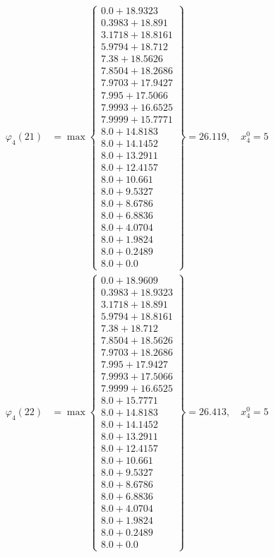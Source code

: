 \documentclass{article}
\begin{document}
\begin{align*}
  
  
  
\varphi_{4}(21) &= \max \left\{ \begin{array}{c}
0.0 + 18.9323 \\
 0.3983 + 18.891 \\
 3.1718 + 18.8161 \\
 5.9794 + 18.712 \\
 7.38 + 18.5626 \\
 7.8504 + 18.2686 \\
 7.9703 + 17.9427 \\
 7.995 + 17.5066 \\
 7.9993 + 16.6525 \\
 7.9999 + 15.7771 \\
 8.0 + 14.8183 \\
 8.0 + 14.1452 \\
 8.0 + 13.2911 \\
 8.0 + 12.4157 \\
 8.0 + 10.661 \\
 8.0 + 9.5327 \\
 8.0 + 8.6786 \\
 8.0 + 6.8836 \\
 8.0 + 4.0704 \\
 8.0 + 1.9824 \\
 8.0 + 0.2489 \\
 8.0 + 0.0
\end{array} \right\}=26.119,\quad x_{4}^0=5\\
  
  
  
  
\varphi_{4}(22) &= \max \left\{ \begin{array}{c}
0.0 + 18.9609 \\
 0.3983 + 18.9323 \\
 3.1718 + 18.891 \\
 5.9794 + 18.8161 \\
 7.38 + 18.712 \\
 7.8504 + 18.5626 \\
 7.9703 + 18.2686 \\
 7.995 + 17.9427 \\
 7.9993 + 17.5066 \\
 7.9999 + 16.6525 \\
 8.0 + 15.7771 \\
 8.0 + 14.8183 \\
 8.0 + 14.1452 \\
 8.0 + 13.2911 \\
 8.0 + 12.4157 \\
 8.0 + 10.661 \\
 8.0 + 9.5327 \\
 8.0 + 8.6786 \\
 8.0 + 6.8836 \\
 8.0 + 4.0704 \\
 8.0 + 1.9824 \\
 8.0 + 0.2489 \\
 8.0 + 0.0
\end{array} \right\}=26.413,\quad x_{4}^0=5\\
  

\end{align*}
\end{document}
